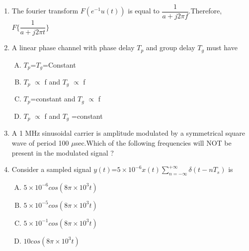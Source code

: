 \documentclass[journal,12pt,twocolumn]{IEEEtran}
\begin{document}
\begin{enumerate}[1.]
\item The fourier transform $F(e^{-1}u(t))$ is equal to $\dfrac{1}{a+j2\pi f}$.Therefore,$F\{\dfrac{1}{a+j2\pi t}\}$\\
\begin{enumerate}[(A)]
\end{enumerate}

\item A linear phase channel with phase delay $T_p$ and group delay $T_g$ must have \\
\begin{enumerate}[(A)]
\setlength\itemsep{2.5em}

\item $T_p$=$T_g$=Constant
\item $T_p$ $\propto$ f and $T_g$ $\propto$ f
\item $T_p$=constant and $T_g$ $\propto$ f
\item $T_p$ $\propto$ f and $T_g$  =constant

\end{enumerate}

\item A 1 MHz sinusoidal carrier is amplitude modulated by a symmetrical square wave of period 100 $\mu$sec.Which of the following frequencies will NOT be present in the modulated signal ? \\
\begin{enumerate}[(A)]
\end{enumerate}

\item Consider a sampled signal $y(t)$=$5\times10^{-6} x(t)\sum\limits_{n=-\infty}^{+\infty}\delta(t-nT_s)$ is \\
\begin{enumerate}[(A)]
\setlength\itemsep{1em}
\item $
5\times10^{-6} cos(8\pi\times10^{3}t)
$
\item $
5\times10^{-5} cos(8\pi\times10^{3}t)
$
\item $
5\times10^{-1} cos(8\pi\times10^{3}t)
$
\item $
10cos(8\pi\times10^{3}t)
$


\end{enumerate}
\end{enumerate}
\end{document}
